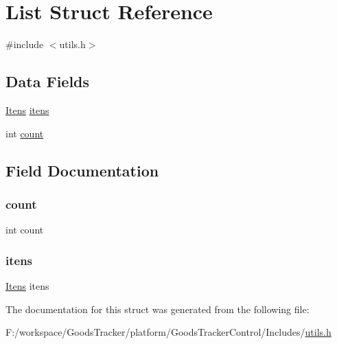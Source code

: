 \hypertarget{struct_list}{}\section{List Struct Reference}
\label{struct_list}


{\ttfamily \#include $<$utils.\+h$>$}

\subsection*{Data Fields}
\begin{DoxyCompactItemize}
\item 
\hyperlink{utils_8h_a45dac1002976b90f5c46861b91ed58fd}{Itens} \hyperlink{struct_list_a2c049709ef86cbd95eacb734bb0aa575}{itens}
\item 
int \hyperlink{struct_list_ad43c3812e6d13e0518d9f8b8f463ffcf}{count}
\end{DoxyCompactItemize}


\subsection{Field Documentation}
\mbox{\label{struct_list_ad43c3812e6d13e0518d9f8b8f463ffcf}} 
\subsubsection{\texorpdfstring{count}{count}}
{\footnotesize\ttfamily int count}

\mbox{\label{struct_list_a2c049709ef86cbd95eacb734bb0aa575}} 
\subsubsection{\texorpdfstring{itens}{itens}}
{\footnotesize\ttfamily \hyperlink{utils_8h_a45dac1002976b90f5c46861b91ed58fd}{Itens} itens}



The documentation for this struct was generated from the following file\+:\begin{DoxyCompactItemize}
\item 
F\+:/workspace/\+Goods\+Tracker/platform/\+Goods\+Tracker\+Control/\+Includes/\hyperlink{utils_8h}{utils.\+h}\end{DoxyCompactItemize}
